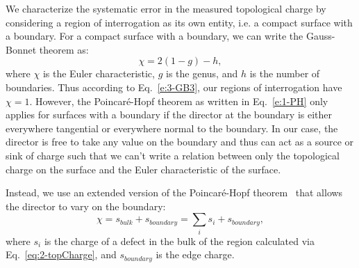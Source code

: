 We characterize the systematic error in the measured topological charge by considering a region of interrogation as its own entity, i.e. a compact surface with a boundary.
For a compact surface with a boundary, we can write the Gauss-Bonnet theorem as:
\begin{equation}
  \chi = 2(1-g)-h,\label{e:3-GB3}
\end{equation}
where $\chi$ is the Euler characteristic, $g$ is the genus, and $h$ is the number of boundaries.
Thus according to Eq.~\ref{e:3-GB3}, our regions of interrogation have $\chi = 1$.
However, the Poincar\'e-Hopf theorem as written in Eq.~\ref{e:1-PH} only applies for surfaces with a boundary if the director at the boundary is either everywhere tangential or everywhere normal to the boundary.
In our case, the director is free to take any value on the boundary and thus can act as a source or sink of charge such that we can't write a relation between only the topological charge on the surface and the Euler characteristic of the surface.

Instead, we use an extended version of the Poincar\'e-Hopf theorem~\cite{RN267} that allows the director to vary on the boundary:
\begin{equation}
  \chi = s_{bulk} + s_{boundary} = \sum\limits_i s_i + s_{boundary},\label{e:3-extendedPH}
\end{equation}
where $s_i$ is the charge of a defect in the bulk of the region calculated via Eq.~\ref{eq:2-topCharge}, and $s_{boundary}$ is the edge charge.


